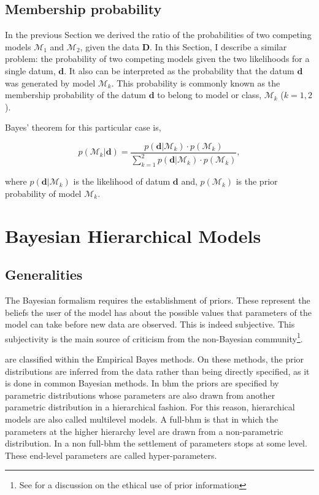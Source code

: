 \subsection{Membership probability}

In the previous Section we {derived} the ratio of the probabilities of two competing models $\mathcal{M}_1$ and $\mathcal{M}_2$, given the data $\mathbf{D}$. In this Section, I describe a similar problem: the probability of two competing models given the two likelihoods for a single datum, $\mathbf{d}$. It also can be interpreted as the probability that the datum $\mathbf{d}$ was generated by model $\mathcal{M}_k$. This probability is commonly known as the membership probability of the datum $\mathbf{d}$ to belong to model or class, $\mathcal{M}_k$ ($k=1,2$). 

Bayes' theorem for this particular case is,

\begin{equation}
\label{eq:prob}
p( \mathcal{M}_k | \mathbf{d}) =\frac{p(\mathbf{d}|\mathcal{M}_k)\cdot p(\mathcal{M}_k)}{\sum_{k=1}^2 p(\mathbf{d}|\mathcal{M}_k)\cdot p(\mathcal{M}_k)},
\end{equation}

where $p(\mathbf{d}|\mathcal{M}_k)$ is the likelihood of datum $\mathbf{d}$ and, $p(\mathcal{M}_k)$ is the prior probability of model $\mathcal{M}_k$.



\section{Bayesian Hierarchical Models}
\label{sect:BHM}
\subsection{Generalities}
\label{sect:generalities}
The Bayesian formalism requires the establishment of priors. These represent the beliefs the user of the model has about the possible values that parameters of the model can take {before new data are observed}. This is indeed subjective. This subjectivity is the main source of criticism from the non-Bayesian community\footnote{See \citet{Gelman2012} for a discussion on the ethical use of prior information}. 

 are classified within the Empirical Bayes methods. On these methods, the prior distributions are inferred from the data rather than being directly specified, as it is done in common Bayesian methods. In \gls{bhm} the priors are specified by parametric distributions whose parameters are also drawn from another parametric distribution in a hierarchical fashion. For this reason, hierarchical models are also called multilevel models. A full-\gls{bhm} is that in which the parameters at the higher hierarchy level are drawn from a non-parametric distribution. In a non full-\gls{bhm} the settlement of parameters stops at some level. These end-level parameters are called hyper-parameters.

